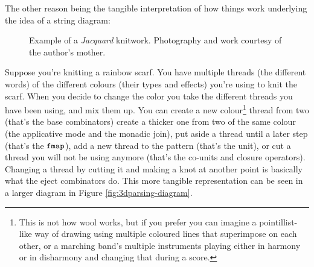 The other reason being the tangible interpretation of how things work
underlying the idea of a string diagram:

\begin{figure}
	\centering
	\caption{Example of a \emph{Jacquard} knitwork. Photography and work courtesy
		of the author's mother.}
	\label{fig:knitting-example}
\end{figure}
Suppose you're knitting a rainbow scarf.
You have multiple threads (the different words) of the different colours (their
types and effects) you're using to knit the scarf.
When you decide to change the color you take the different threads you have
been using, and mix them up.
You can create a new colour\footnote{This is not how wool works, but
	if you prefer you can imagine a pointillist-like way of drawing using multiple
	coloured lines that superimpose on each other, or a marching band's multiple
	instruments playing either in harmony or in disharmony and changing that
	during a score.} thread from two (that's the base combinators) create a
thicker one from two of the same colour (the applicative mode and the monadic
join), put aside a thread until a later step (that's the $\texttt{fmap}$), add a new
thread to the pattern (that's the unit), or cut a thread you will not be
using anymore (that's the co-units and closure operators).
Changing a thread by cutting it and making a knot at another point is basically
what the eject combinators do.
This more tangible representation can be seen in a larger diagram in Figure
\ref{fig:3dparsing-diagram}.



